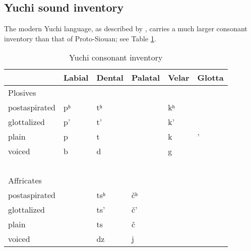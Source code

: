\documentclass[output=paper]{LSP/langsci}
\begin{document}
{\subsection{Yuchi sound inventory}

The modern Yuchi language, as described by \citet{Linn2000}, carries a much larger consonant inventory than that of Proto-Siouan; see Table \ref{yuchiinventory}.

\begin{table}[h!]
\caption{Yuchi consonant inventory} \label{yuchiinventory}
    \begin{tabular}{llllll}\lsptoprule
    ~                           & Labial    &  Dental      &  Palatal        &  Velar      & Glotta  \\
    \midrule
     Plosives            & ~                   & ~                    & ~                       & ~                   & ~                \\
    postaspirated               & pʰ & tʰ  & ~                       & kʰ & ~                \\
    glottalized                 & p'                  & t'                   & ~                       & k'                  & ~                \\
    plain                       & p                   & t                    & ~                       & k                   & '                \\
    voiced                      & b                   & d                    & ~                       & g                   & ~                \\
    ~                           & ~                   & ~                    & ~                       & ~                   & ~                \\
    Affricates        & ~                   & ~                    & ~                       & ~                   & ~                \\
    postaspirated               & ~                   & tsʰ & \v{c}ʰ & ~                   & ~                \\
    glottalized                 & ~                   & ts'                  & \v{c}'                  & ~                   & ~                \\
    plain                       & ~                   & ts                   & \v{c}                   & ~                   & ~                \\
    voiced                      & ~                   & dz                   & j                  & ~                   & ~                \\

\end{tabular}
\end{table}}
\end{document}

